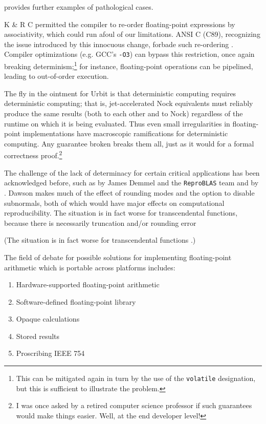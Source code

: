 \documentclass[twoside]{article}
\begin{document}
\citet{Higham2002} provides further examples of pathological cases.

K \& R C permitted the compiler to re-order floating-point expressions by associativity, which could run afoul of our limitations.  ANSI C (C89), recognizing the issue introduced by this innocuous change, forbade such re-ordering \citep{MacDonald1991}.  Compiler optimizations (e.g. GCC's \texttt{-O3}) can bypass this restriction, once again breaking determinism;\footnote{This can be mitigated again in turn by the use of the \texttt{volatile} designation, but this is sufficient to illustrate the problem.} for instance, floating-point operations can be pipelined, leading to out-of-order execution.

The fly in the ointment for Urbit is that deterministic computing requires deterministic computing; that is, jet-accelerated Nock equivalents must reliably produce the same results (both to each other and to Nock) regardless of the runtime on which it is being evaluated.  Thus even small irregularities in floating-point implementations have macroscopic ramifications for deterministic computing.  Any guarantee broken breaks them all, just as it would for a formal correctness proof.\footnote{I was once asked by a retired computer science professor if such guarantees would make things easier.  Well, at the end developer level!}

The challenge of the lack of determinacy for certain critical applications has been acknowledged before, such as by James Demmel and the \texttt{ReproBLAS} team \citep{Demmel2017, ReproBLAS} and by \citeauthor{Dawson2013}.  Dawson makes much of the effect of rounding modes and the option to disable subnormals, both of which would have major effects on computational reproducibility.  The situation is in fact worse for transcendental functions, because there is necessarily truncation and/or rounding error

(The situation is in fact worse for transcendental functions \citep{Dawson2013}.)

The field of debate for possible solutions for implementing floating-point arithmetic which is portable across platforms includes:

\begin{enumerate}
  \item  Hardware-supported floating-point arithmetic
  \item  Software-defined floating-point library
  \item  Opaque calculations
  \item  Stored results
  \item  Proscribing IEEE 754
\end{enumerate}
\end{document}
